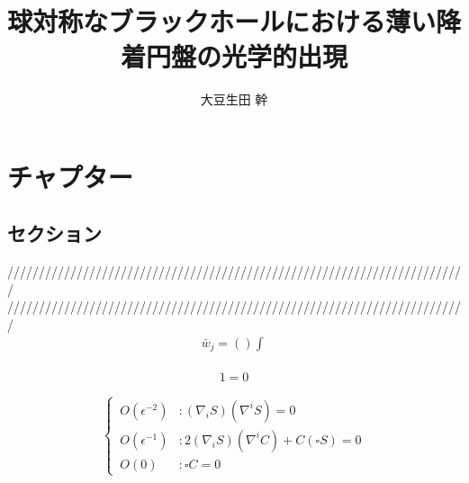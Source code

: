 \documentclass[dvipdfmx]{report} %
\title{球対称なブラックホールにおける薄い降着円盤の光学的出現}
\author{大豆生田 幹}
\date{}
\begin{document}
\maketitle %
\tableofcontents %

\chapter{チャプター}

\section{セクション}

/////////////////////////////////////////////////////////////////////////\\
/////////////////////////////////////////////////////////////////////////
\begin{equation*}
\begin{split}
	\bar{w}_j = \left( \right) \int^{}_{}
\end{split}
\end{equation*}

\begin{tcolorbox}[title=メモ用]
\begin{eqnarray*}
	1 = 0
\end{eqnarray*}
\end{tcolorbox}

\begin{equation}
\left\{ \,
\begin{aligned}
	O(\epsilon^{-2}) &: \left( \nabla_i S \right) \left( \nabla^i S \right) = 0\\
	O(\epsilon^{-1}) &: 2 \left( \nabla_i S \right) \left( \nabla^i C \right) + C \left( \square S \right) = 0\\
	O(0) &: \square C = 0
\end{aligned}
\right.
\end{equation}
\end{document}
